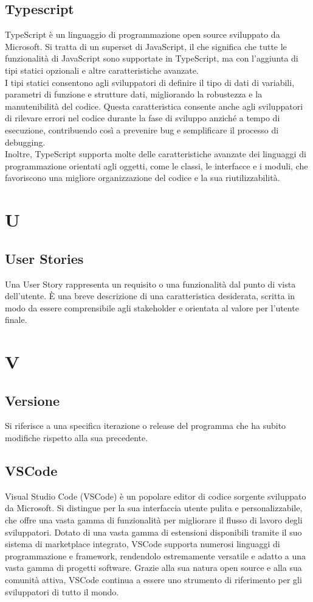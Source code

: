 \documentclass{article}
\begin{document}
\subsection{Typescript}
TypeScript è un linguaggio di programmazione open source sviluppato da Microsoft. Si tratta di un superset di JavaScript, il che significa che tutte le funzionalità di JavaScript sono supportate in TypeScript, ma con l'aggiunta di tipi statici opzionali e altre caratteristiche avanzate.\\
I tipi statici consentono agli sviluppatori di definire il tipo di dati di variabili, parametri di funzione e strutture dati, migliorando la robustezza e la manutenibilità del codice. Questa caratteristica consente anche agli sviluppatori di rilevare errori nel codice durante la fase di sviluppo anziché a tempo di esecuzione, contribuendo così a prevenire bug e semplificare il processo di debugging.\\
Inoltre, TypeScript supporta molte delle caratteristiche avanzate dei linguaggi di programmazione orientati agli oggetti, come le classi, le interfacce e i moduli, che favoriscono una migliore organizzazione del codice e la sua riutilizzabilità.

\section{U}
\subsection{User Stories}
Una User Story rappresenta un requisito o una funzionalità dal punto di vista dell'utente. È una breve descrizione di una caratteristica desiderata, scritta in modo da essere comprensibile agli stakeholder e orientata al valore per l'utente finale.

\section{V}
\subsection{Versione}
Si riferisce a una specifica iterazione o release del programma che ha subito modifiche rispetto alla sua precedente.

\subsection{VSCode}
Visual Studio Code (VSCode) è un popolare editor di codice sorgente sviluppato da Microsoft. Si distingue per la sua interfaccia utente pulita e personalizzabile, che offre una vasta gamma di funzionalità per migliorare il flusso di lavoro degli sviluppatori. Dotato di una vasta gamma di estensioni disponibili tramite il suo sistema di marketplace integrato, VSCode supporta numerosi linguaggi di programmazione e framework, rendendolo estremamente versatile e adatto a una vasta gamma di progetti software. Grazie alla sua natura open source e alla sua comunità attiva, VSCode continua a essere uno strumento di riferimento per gli sviluppatori di tutto il mondo.
\end{document}
